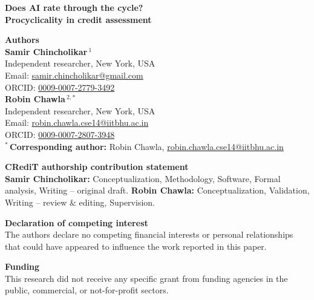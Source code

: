 \documentclass[11pt]{article}
\begin{document}
\begin{center}
{\LARGE\textbf{Does AI rate through the cycle?}}\\[3pt]
{\large\textbf{Procyclicality in credit assessment}}
\end{center}
\vspace{18pt}
{\large\textbf{Authors}}\\[4pt]
\textbf{Samir Chincholikar}\,$^{1}$\\
Independent researcher, New York, USA\\
Email: \href{mailto:samir.chincholikar@gmail.com}{samir.chincholikar@gmail.com}\\
ORCID: \href{https://orcid.org/0009-0007-2779-3492}{0009-0007-2779-3492}\\[8pt]
\textbf{Robin Chawla}\,$^{2,*}$\\
Independent researcher, New York, USA\\
Email: \href{mailto:robin.chawla.cse14@iitbhu.ac.in}{robin.chawla.cse14@iitbhu.ac.in}\\
ORCID: \href{https://orcid.org/0009-0007-2807-3948}{0009-0007-2807-3948}\\[12pt]
$^{*}$\,\textbf{Corresponding author:} Robin Chawla, \href{mailto:robin.chawla.cse14@iitbhu.ac.in}{robin.chawla.cse14@iitbhu.ac.in}
\vspace{18pt}

{\large\textbf{CRediT authorship contribution statement}}\\[4pt]
\textbf{Samir Chincholikar:} Conceptualization, Methodology, Software, Formal analysis, Writing -- original draft.
\textbf{Robin Chawla:} Conceptualization, Validation, Writing -- review \& editing, Supervision.
\vspace{14pt}

{\large\textbf{Declaration of competing interest}}\\[4pt]
The authors declare no competing financial interests or personal relationships that could have appeared
to influence the work reported in this paper.
\vspace{14pt}

{\large\textbf{Funding}}\\[4pt]
This research did not receive any specific grant from funding agencies in the public, commercial, or
not-for-profit sectors.
\end{document}
